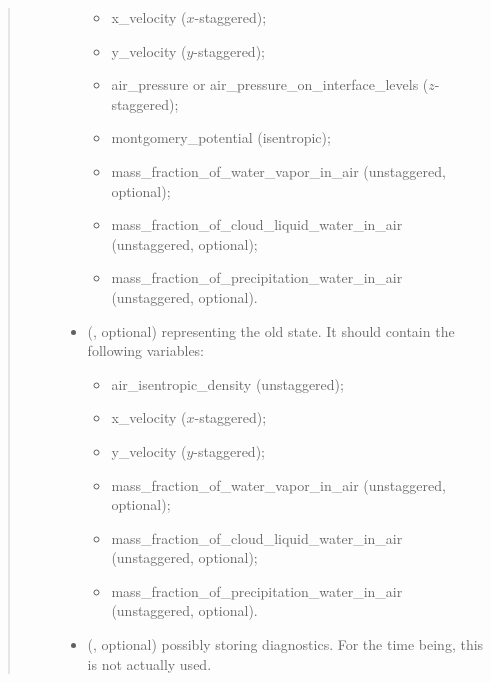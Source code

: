\documentclass[letterpaper,10pt,english]{sphinxmanual}
\begin{document}
\begin{fulllineitems}
\begin{fulllineitems}
\begin{quote}
\begin{description}
\begin{itemize}
\begin{itemize}
\item {} 
x\_velocity (\(x\)-staggered);

\item {} 
y\_velocity (\(y\)-staggered);

\item {} 
air\_pressure or air\_pressure\_on\_interface\_levels (\(z\)-staggered);

\item {} 
montgomery\_potential (isentropic);

\item {} 
mass\_fraction\_of\_water\_vapor\_in\_air (unstaggered, optional);

\item {} 
mass\_fraction\_of\_cloud\_liquid\_water\_in\_air (unstaggered, optional);

\item {} 
mass\_fraction\_of\_precipitation\_water\_in\_air (unstaggered, optional).

\end{itemize}


\item {} 
 (, optional) \textendash{} 
{\hyperref[\detokenize{api:storages.state_isentropic.StateIsentropic}]{}} representing the old state.
It should contain the following variables:
\begin{itemize}
\item {} 
air\_isentropic\_density (unstaggered);

\item {} 
x\_velocity (\(x\)-staggered);

\item {} 
y\_velocity (\(y\)-staggered);

\item {} 
mass\_fraction\_of\_water\_vapor\_in\_air (unstaggered, optional);

\item {} 
mass\_fraction\_of\_cloud\_liquid\_water\_in\_air (unstaggered, optional);

\item {} 
mass\_fraction\_of\_precipitation\_water\_in\_air (unstaggered, optional).

\end{itemize}


\item {} 
 (, optional) \textendash{} {\hyperref[\detokenize{api:storages.grid_data.GridData}]{}} possibly storing diagnostics.
For the time being, this is not actually used.


\end{itemize}
\end{description}
\end{quote}
\end{fulllineitems}
\end{fulllineitems}
\end{document}
